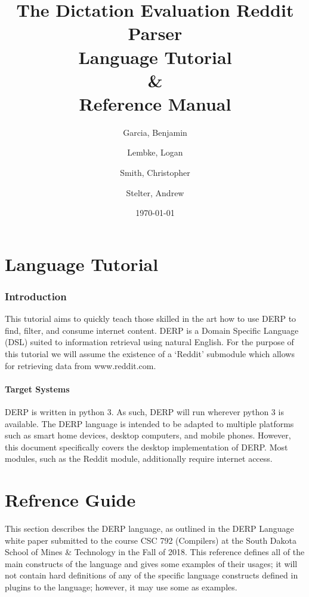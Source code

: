 \documentclass{article}
\title{\textbf{The Dictation Evaluation Reddit Parser \\ Language Tutorial \\ \& \\ Reference Manual}}
\author{
Garcia, Benjamin \and
Lembke, Logan \and
Smith, Christopher \and
Stelter, Andrew
}
\date{\today}
\begin{document}
\maketitle %

\newpage
\tableofcontents




\newpage


\part{Language Tutorial}
\section{Introduction}
This tutorial aims to quickly teach those skilled in the art how to use DERP to find, filter, and consume internet content. DERP is a Domain Specific Language (DSL) suited to information retrieval using natural English. For the purpose of this tutorial we will assume the existence of a ‘Reddit’ submodule which allows for retrieving data from www.reddit.com.

\subsection{Target Systems}
DERP is written in python 3. As such, DERP will run wherever python 3 is available. The DERP language is intended to be adapted to multiple platforms such as smart home devices, desktop computers, and mobile phones. However, this document specifically covers the desktop implementation of DERP. Most modules, such as the Reddit module, additionally require internet access.





\break

\part{Refrence Guide}
This section describes the DERP language, as outlined in the DERP Language white paper submitted
to the course CSC 792 (Compilers) at the South Dakota School of Mines \& Technology in the Fall
of 2018. This reference defines all of the main constructs of the language and gives some examples
of their usages; it will not contain hard definitions of any of the specific language constructs
defined in plugins to the language; however, it may use some as examples.






\end{document}
